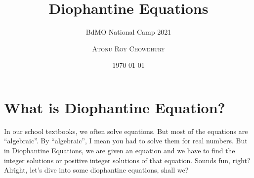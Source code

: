 \documentclass[11pt]{scrartcl}
\begin{document}
\title{Diophantine Equations}
\subtitle{BdMO National Camp 2021}
\author{\scshape{Atonu Roy Chowdhury} \\
}
\date{\today}
\maketitle

\section{What is Diophantine Equation?}
In our school textbooks, we often solve equations. But most of the equations are ``algebraic''. By ``algebraic'', I mean you had to solve them for real numbers. But in Diophantine Equations, we are given an equation and we have to find the integer solutions or positive integer solutions of that equation. Sounds fun, right? Alright, let's dive into some diophantine equations, shall we?
\end{document}
